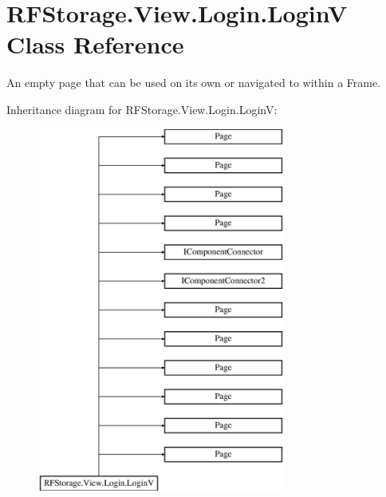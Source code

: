 \hypertarget{class_r_f_storage_1_1_view_1_1_login_1_1_login_v}{}\section{R\+F\+Storage.\+View.\+Login.\+LoginV Class Reference}
\label{class_r_f_storage_1_1_view_1_1_login_1_1_login_v}


An empty page that can be used on its own or navigated to within a Frame.  


Inheritance diagram for R\+F\+Storage.\+View.\+Login.\+LoginV\+:\begin{figure}[H]
\begin{center}
\leavevmode
\includegraphics[height=12.000000cm]{class_r_f_storage_1_1_view_1_1_login_1_1_login_v}
\end{center}
\end{figure}
